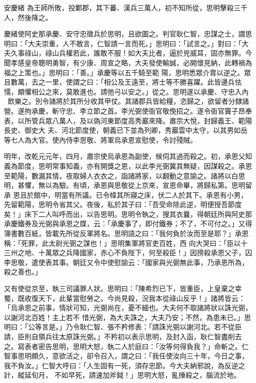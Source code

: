 \begin{pinyinscope}
 安慶緒
 為王師所敗，投鄴郡，其下蕃、漢兵三萬人，初不知所從，思明擊殺三千人，然後降之。



 慶緒使阿史那承慶、安守忠徵兵於思明，且欲圖之。判官耿仁智，忠謀之士，謂思明曰：「大夫崇重，人不敢言，仁智請一言而死。」思明曰：「試言之。」對曰：「大夫久事祿山，祿山兵權若此，誰敢不服！如大夫比者，逼於兇威耳，固亦無罪。今聞孝感皇帝聰明勇智，有少康、周宣之略，大夫發使輸誠，必開懷見納，此轉禍為福之上策也。」思明曰：「善。」承慶等以五千騎至範
 陽，思明悉眾介胄以逆之。眾且數萬，去之一里，使謂之曰：「相公及王遠至，將士等不勝喜躍。此皆邊兵怯懦，頗懼相公之來，莫敢進也。請弛弓以安之。」從之。思明遂以承慶、守忠入內，飲樂之。別令諸將於其所分收其甲仗。其諸郡兵皆給糧，恣歸之，欲留者分隸諸營。遂拘承慶，斬守忠、李立節之首。李光弼使衙官敬俛招之。遂令衙官竇子昂奉表，以所管兵眾八萬人，及以偽河東節度高秀巖來降。肅宗大悅，封歸義王、範陽長史、御史大
 夫、河北節度使，朝義已下並為列卿，秀巖雲中太守，以其男如岳等七人為大官。使內侍李思敬、將軍烏承恩宣慰使，令討殘賊。



 明年，改乾元元年，四月，肅宗使烏承恩為副使，候伺其過而殺之。初，承恩父知義為節度，思明常事知義，亦有開獎之恩，以此李光弼冀其無疑，因謀殺之。承恩至範陽，數漏其情，夜取婦人衣衣之，詣諸將家，以翻動之意諭之。諸將以白思明，甚懼，無以為驗。有頃，承恩與思敬從上京來，宣恩命畢，將歸私第。思明留承
 恩且於館中，明當有所議。已令幃其所寢之床，伏二人於其下。承恩有小男，先留範陽，思明令省其父。夜後，私於其子曰：「吾受命除此逆，明便授吾節度矣！」床下二人叫呼而出，以告思明。思明令執之，搜其衣曩，得朝廷所與阿史那承慶鐵券及光弼與承恩之牒，云：「承慶事了，即付鐵券；不了，不可付之。」又得簿書數百紙，皆載先所從反軍將名。思明語之曰：「我何負於汝而至是耶？」承恩稱：「死罪，此太尉光弼之謀也！」思明集軍將官吏百姓，西
 向大哭曰：「臣以十三州之地、十萬眾之兵降國家，赤心不負陛下，何至殺臣！」因搒殺承恩父子，囚李思敬，遣使表其事。朝廷又令中使慰諭云：「國家與光弼無此事，乃承恩所為，殺之善也。」



 又有使從京至，執三司議罪人狀。思明曰：「陳希烈已下，皆重臣，上皇棄之幸蜀，既收復天下，此輩當慰勞之。今尚見殺，況我本從祿山反乎！」諸將皆云：「烏承恩之前事，情狀可知，光弼尚在，憂不細也。大夫何不取諸將狀以誅光弼，以謝河北百姓！主上若不
 惜光弼，為大夫誅之，大夫乃安；不然，為患未已。」思明曰：「公等言是。」乃令耿仁智、張不矜修表：「請誅光弼以謝河北。若不從臣請，臣則自領兵往太原誅光弼。」不矜初以表示思明，及封入函，耿仁智盡削去之。寫表者密告思明，思明大怒，執二人於庭曰：「汝等何得負我？」命斬之。仁智事思明頗久，意欲活之，卻令召入，謂之曰：「我任使汝向三十年，今日之事，我不負汝。」仁智大呼曰：「人生固有一死，須存忠節。今大夫納邪說，為反逆之計，縱延旬月，
 不如早死，請速加斧鉞！」思明大怒，亂捶殺之，腦流於地。




\end{pinyinscope}
